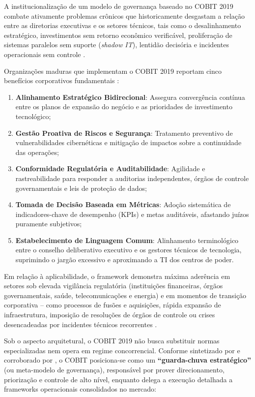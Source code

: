 A institucionalização de um modelo de governança baseado no COBIT 2019 combate ativamente problemas crônicos que historicamente desgastam a relação entre as diretorias executivas e os setores técnicos, tais como o desalinhamento estratégico, investimentos sem retorno econômico verificável, proliferação de sistemas paralelos sem suporte (\textit{shadow IT}), lentidão decisória e incidentes operacionais sem controle \cite{fernandes2014implantando,feely2007getting}.

Organizações maduras que implementam o COBIT 2019 reportam cinco benefícios corporativos fundamentais \cite{isaca2019framework}:
\begin{enumerate}
    \item \textbf{Alinhamento Estratégico Bidirecional}: Assegura convergência contínua entre os planos de expansão do negócio e as prioridades de investimento tecnológico;
    \item \textbf{Gestão Proativa de Riscos e Segurança}: Tratamento preventivo de vulnerabilidades cibernéticas e mitigação de impactos sobre a continuidade das operações;
    \item \textbf{Conformidade Regulatória e Auditabilidade}: Agilidade e rastreabilidade para responder a auditorias independentes, órgãos de controle governamentais e leis de proteção de dados;
    \item \textbf{Tomada de Decisão Baseada em Métricas}: Adoção sistemática de indicadores-chave de desempenho (KPIs) e metas auditáveis, afastando juízos puramente subjetivos;
    \item \textbf{Estabelecimento de Linguagem Comum}: Alinhamento terminológico entre o conselho deliberativo executivo e os gestores técnicos de tecnologia, suprimindo o jargão excessivo e aproximando a TI dos centros de poder.
\end{enumerate}

Em relação à aplicabilidade, o framework demonstra máxima aderência em setores sob elevada vigilância regulatória (instituições financeiras, órgãos governamentais, saúde, telecomunicações e energia) e em momentos de transição corporativa -- como processos de fusões e aquisições, rápida expansão de infraestrutura, imposição de resoluções de órgãos de controle ou crises desencadeadas por incidentes técnicos recorrentes \cite{fernandes2014implantando}.

Sob o aspecto arquitetural, o COBIT 2019 não busca substituir normas especializadas nem opera em regime concorrencial. Conforme sintetizado por  e corroborado por , o COBIT posiciona-se como um \textbf{``guarda-chuva estratégico''} (ou meta-modelo de governança), responsável por prover direcionamento, priorização e controle de alto nível, enquanto delega a execução detalhada a frameworks operacionais consolidados no mercado:


